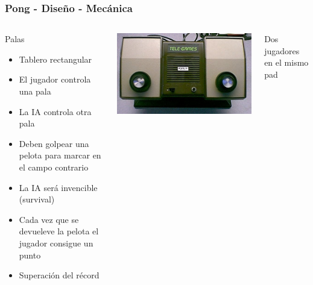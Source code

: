 \begin{frame}
	\frametitle{Pong - Diseño - Mecánica}
	
	\begin{columns}[c]
	\column{175pt}	
	
	\begin{block}{Palas}
		\begin{itemize}
			\item Tablero rectangular
			\item El jugador controla una pala
			\item La IA controla otra pala
			\item Deben golpear una pelota para marcar en el campo contrario
			\item La IA será invencible (survival)
			\item Cada vez que se devueleve la pelota el jugador consigue un punto
			\item Superación del récord
		\end{itemize}            
	\end{block}
	
	\column{125pt}
	
	\begin{center}
		\includegraphics[scale=0.45]{img/telepong.jpg}
	\end{center}
	
	\begin{center}
	    Dos jugadores en el mismo pad
	\end{center}	
	
	\end{columns}
	
\end{frame}

